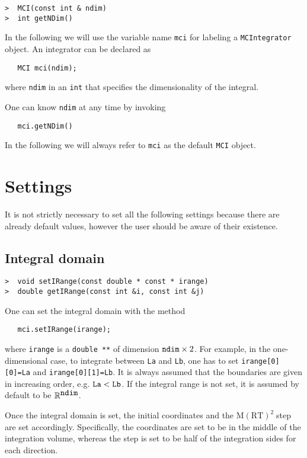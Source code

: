 \documentclass[11pt,a4paper,twoside]{article}
\newcommand{\MRTWO}{$ \text{M}(\text{RT})^2 \;$}
\begin{document}
\begin{verbatim}
>  MCI(const int & ndim)
>  int getNDim()
\end{verbatim}

In the following we will use the variable name \verb+mci+ for labeling a \verb+MCIntegrator+ object.
An integrator can be declared as
\begin{verbatim}
   MCI mci(ndim);
\end{verbatim}
where \verb+ndim+ in an \verb+int+ that specifies the dimensionality of the integral.

One can know \verb+ndim+ at any time by invoking
\begin{verbatim}
   mci.getNDim()
\end{verbatim}

In the following we will always refer to \verb+mci+ as the default \verb+MCI+ object.


\section{Settings}
It is not strictly necessary to set all the following settings because there are already default values, however the user should be aware of their existence.


\subsection{Integral domain} %
\label{sub:integral_domain}

\begin{verbatim}
>  void setIRange(const double * const * irange)
>  double getIRange(const int &i, const int &j)
\end{verbatim}

One can set the integral domain with the method
\begin{verbatim}
   mci.setIRange(irange);
\end{verbatim}
where \verb+irange+ is a \verb+double **+ of dimension $\verb+ndim+ \times 2$.
For example, in the one-dimensional case, to integrate between \verb+La+ and \verb+Lb+, one has to set \verb+irange[0][0]=La+ and \verb+irange[0][1]=Lb+.
It is always assumed that the boundaries are given in increasing order, e.g. $\verb+La+ < \verb+Lb+$.
If the integral range is not set, it is assumed by default to be $\mathbb{R}^{\verb+ndim+}$.

Once the integral domain is set, the initial coordinates and the \MRTWO step are set accordingly.
Specifically, the coordinates are set to be in the middle of the integration volume, whereas the step is set to be half of the integration sides for each direction.
\end{document}
